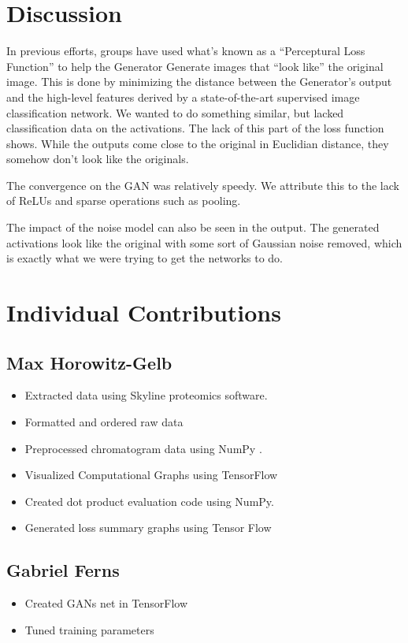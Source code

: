 \documentclass[12pt]{article}
\begin{document}
{\section{Discussion}
In previous efforts, groups have used what's known as a ``Perceptural Loss
Function'' to help the Generator Generate images that ``look like'' the original
image. This is done by minimizing the distance between the Generator's output
and the high-level features derived by a state-of-the-art supervised image
classification network. We wanted to do something similar, but lacked
classification data on the activations. The lack of this part of the loss
function shows. While the outputs come close to the original in Euclidian
distance, they somehow don't look like the originals.

The convergence on the GAN was relatively speedy. We attribute this to the lack
of ReLUs and sparse operations such as pooling.

The impact of the noise model can also be seen in the output. The generated
activations look like the original with some sort of Gaussian noise removed,
which is exactly what we were trying to get the networks to do.

\section{Individual Contributions}
\subsection{Max Horowitz-Gelb}
\begin{itemize}
\item Extracted data using Skyline \cite{Skyline} proteomics software. 
\item Formatted and ordered raw data
\item Preprocessed chromatogram data using NumPy \cite{numpy}.
\item Visualized Computational Graphs using TensorFlow \cite{TensorFlow}
\item Created dot product evaluation code using NumPy.
\item Generated loss summary graphs using Tensor Flow
\end{itemize}

\subsection{Gabriel Ferns}
\begin{itemize}
\item Created GANs net in TensorFlow
\item Tuned training parameters
\end{itemize}


}
\end{document}
